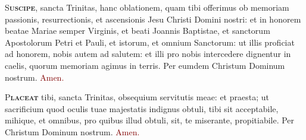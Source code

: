 \documentclass[12pt, landscape]{scrartcl}
\newcommand{\amen}{\textcolor{Maroon}{Amen.}}
\newcommand{\initial}[2]{\lettrine[lines=3]{\color{Maroon}#1}{\bfseries\color{Maroon}#2}}
\newcommand{\gap}{\vspace{0.65cm}}
\begin{document}
\begin{center}
\begin{minipage}[t]{0.29\linewidth}
        \gap

        \initial{S}{uscipe}, sancta Trinitas, hanc oblationem, quam tibi
        offerimus ob memoriam passionis, resurrectionis, et ascensionis Jesu
        Christi Domini nostri: et in honorem beatae Mariae semper Virginis, et
        beati Joannis Baptistae, et sanctorum Apostolorum Petri et Pauli, et
        istorum, et omnium Sanctorum: ut illis proficiat ad honorem, nobis autem
        ad salutem: et illi pro nobis intercedere dignentur in caelis, quorum
        memoriam agimus in terris. Per eumdem Christum Dominum nostrum. \amen

        \gap

        \initial{P}{laceat} tibi, sancta Trinitas, obsequium servitutis meae: et
        praesta; ut sacrificium quod oculis tuae majestatis indignus obtuli,
        tibi sit acceptabile, mihique, et omnibus, pro quibus illud obtuli, sit,
        te miserante, propitiabile. Per Christum Dominum nostrum. \amen

    \end{minipage}
\end{center}

\end{document}
